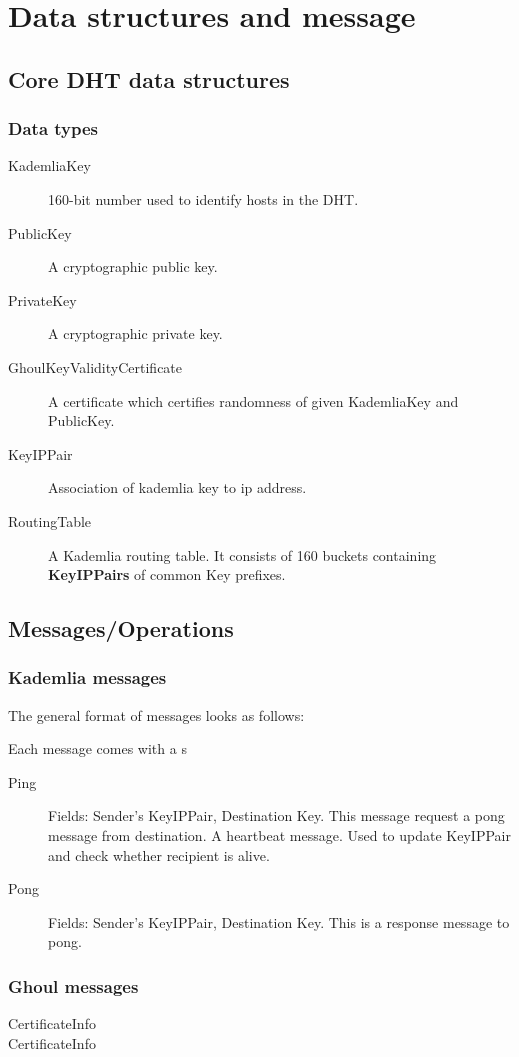 \section{Data structures and message}

\subsection{Core DHT data structures}
\subsubsection{Data types}
\begin{description}
  \item[KademliaKey] 160-bit number used to identify hosts in the DHT. 
  \item[PublicKey] A cryptographic public key.
  \item[PrivateKey] A cryptographic private key.
  \item[GhoulKeyValidityCertificate] A certificate which certifies randomness of
    given KademliaKey and PublicKey.
  \item[KeyIPPair] Association of kademlia key to ip address.
  \item[RoutingTable] A Kademlia routing table. It consists of 160 buckets
    containing \textbf{KeyIPPairs} of common Key prefixes.
\end{description}

\subsection{Messages/Operations}
\subsubsection{Kademlia messages}
The general format of messages looks as follows:

Each message comes with a s
\begin{description}
  \item[Ping] Fields: Sender's KeyIPPair, Destination Key.  This message request
    a pong message from destination. A heartbeat message. Used to update
    KeyIPPair and check whether recipient is alive.
  \item[Pong] Fields: Sender's KeyIPPair, Destination Key.  This is a response
    message to pong.
\end{description}

\subsubsection{Ghoul messages}
\begin{description}
  \item[CertificateInfo]   
  \item[CertificateInfo]   
\end{description}

